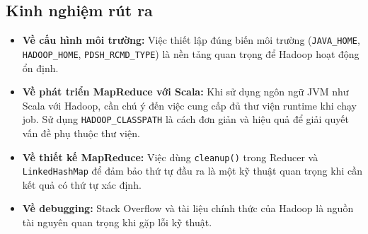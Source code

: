 \subsection{Kinh nghiệm rút ra}

\begin{itemize}
    \item \textbf{Về cấu hình môi trường:} Việc thiết lập đúng biến môi trường (\texttt{JAVA\_HOME}, \texttt{HADOOP\_HOME}, \texttt{PDSH\_RCMD\_TYPE}) là nền tảng quan trọng để Hadoop hoạt động ổn định.

    \item \textbf{Về phát triển MapReduce với Scala:} Khi sử dụng ngôn ngữ JVM như Scala với Hadoop, cần chú ý đến việc cung cấp đủ thư viện runtime khi chạy job. Sử dụng \texttt{HADOOP\_CLASSPATH} là cách đơn giản và hiệu quả để giải quyết vấn đề phụ thuộc thư viện.

    \item \textbf{Về thiết kế MapReduce:} Việc dùng \texttt{cleanup()} trong Reducer và \texttt{LinkedHashMap} để đảm bảo thứ tự đầu ra là một kỹ thuật quan trọng khi cần kết quả có thứ tự xác định.

    \item \textbf{Về debugging:} Stack Overflow và tài liệu chính thức của Hadoop là nguồn tài nguyên quan trọng khi gặp lỗi kỹ thuật.
\end{itemize}
